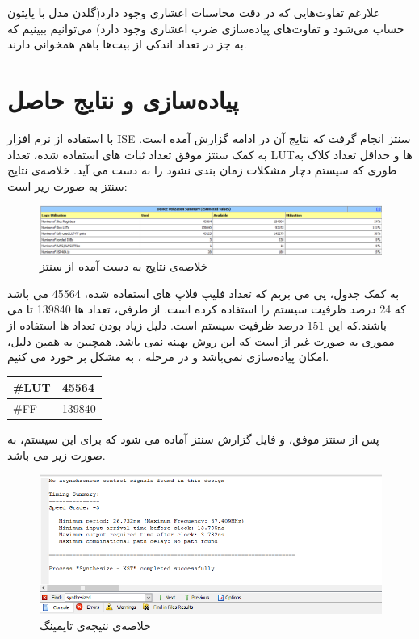 \documentclass[12pt,onecolumn,a4paper,fleqn]{article}
\begin{document}
علارغم تفاوت‌هایی که در دقت محاسبات اعشاری وجود دارد(گلدن مدل با پایتون حساب می‌شود و تفاوت‌های پیاده‌سازی ضرب اعشاری وجود دارد) می‌توانیم ببینیم که به جز در تعداد اندکی از بیت‌ها باهم همخوانی دارند.

\pagebreak

\section{پیاده‌سازی و نتایج حاصل}

با استفاده از نرم افزار ISE سنتز انجام گرفت که نتایج آن در ادامه گزارش آمده است.
به کمک سنتز موفق تعداد ثبات های استفاده شده، تعداد LUTها و حداقل تعداد کلاک به طوری که سیستم دچار مشکلات زمان بندی نشود را به دست می آید.
خلاصه‌ی نتایج سنتز به صورت زیر است:

\begin{figure}[h]
	\centering
	\includegraphics[width=0.95\linewidth]{source/2.png}
	\caption{خلاصه‌ی نتایج به دست آمده از سنتز}
\end{figure}

به کمک جدول، پی می بریم که تعداد فلیپ فلاپ های استفاده شده، 45564 می باشد که 24 درصد ظرفیت سیستم را استفاده کرده است. از طرفی، تعداد  ها 139840 تا می باشند.که این 151 درصد ظرفیت سیستم است. دلیل زیاد بودن تعداد ها استفاده از مموری  به صورت غیر از است که این روش بهینه نمی باشد. همچنین به همین دلیل، امکان پیاده‌سازی نمی‌باشد و در مرحله ، به مشکل بر خورد می کنیم.

\begin{latin}

\begin{table}[h]
	\centering
	\begin{tabular}{|l|l|}
		\hline
		\#LUT & 45564  \\ \hline
		\#FF  & 139840 \\ \hline
	\end{tabular}
\end{table}

\end{latin}

پس از سنتز موفق،  و فایل گزارش سنتز آماده می شود که برای این سیستم، به صورت زیر می باشد.

\begin{figure}[h]
	\centering
	\includegraphics[width=0.95\linewidth]{source/3.png}
	\caption{خلاصه‌ی نتیجه‌‌ی تایمینگ}
\end{figure}
\end{document}
